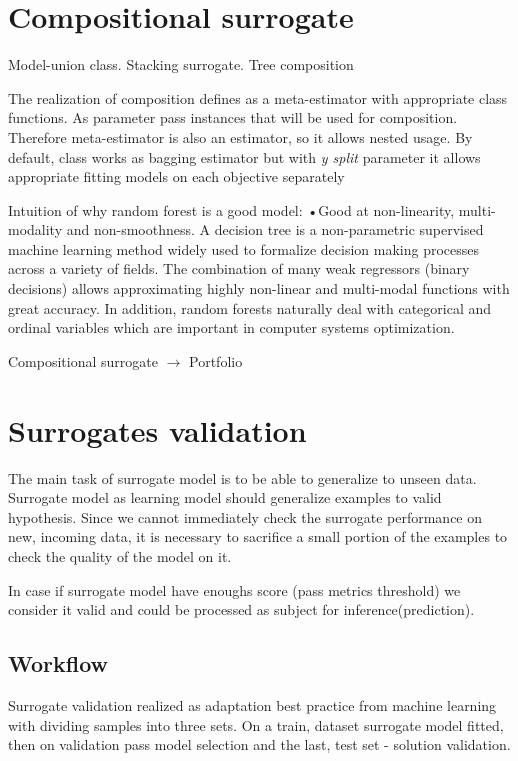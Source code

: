 \section{Compositional surrogate}

    Model-union class.  Stacking surrogate. Tree composition

    The realization of composition defines as a meta-estimator with appropriate class functions. As parameter pass instances that will be used for composition. Therefore meta-estimator is also an estimator, so it allows nested usage. By default, class works as bagging estimator but with \emph{y split} parameter it allows appropriate fitting models on each objective separately

    Intuition of why random forest is a good model: •Good at non-linearity, multi-modality and non-smoothness. A decision tree is a non-parametric supervised machine learning method widely used to formalize decision making processes across a variety of fields. The combination of many weak regressors (binary decisions) allows approximating highly non-linear and multi-modal functions with great accuracy. In addition, random forests naturally deal with categorical and ordinal variables which are important in computer systems optimization.

    Compositional surrogate $\rightarrow$ Portfolio

\section{Surrogates validation}
The main task of surrogate model is to be able to generalize to unseen data. Surrogate model as learning model should generalize examples to valid hypothesis. Since we cannot immediately check the surrogate performance on new, incoming data, it is necessary to sacrifice a small portion of the examples to check the quality of the model on it. 

In case if surrogate model have enoughs score (pass metrics threshold) we consider it valid and could be processed as subject for inference(prediction).

    \subsection{Workflow}
    Surrogate validation realized as adaptation best practice from machine learning with dividing samples into three sets.
    On a train, dataset surrogate model fitted, then on validation pass model selection and the last, test set - solution validation. 


